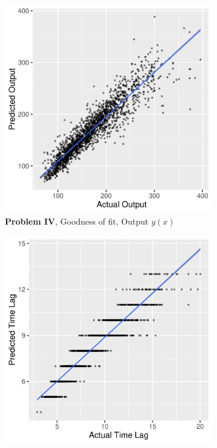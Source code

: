 \documentclass[envcountsect,runningheads]{llncs}
\theoremstyle{etoile}
\begin{document}
\begin{figure}
  \centering

  \begin{subfigure}[b]{0.4\textwidth}
    \centering
    \includegraphics[width=\textwidth]{figures/exp4_scatter_v_test}
    \caption{ \textbf{Problem IV}, Goodness of fit, Output $y(x)$}
    \label{fig:problem4_fitv}
  \end{subfigure}
  \hfill
  \begin{subfigure}[b]{0.4\textwidth}
    \centering
    \includegraphics[width=\textwidth]{figures/exp4_scatter_t_test}

\end{subfigure}
\end{figure}
\end{document}
